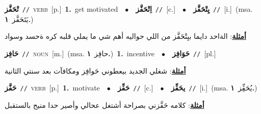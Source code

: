 \documentclass[10pt,a4paper,twoside]{article} %
\begin{document}
\begin{multicols}{2}
{\setlength\topsep{0pt}\textbf{\foreignlanguage{arabic}{تْحَفَّز}}\ {\color{gray}\texttt{//}\color{black}}\ \textsc{verb}\ [p.]\ \textbf{1.}~get motivated\ \ $\bullet$\ \ \setlength\topsep{0pt}\textbf{\foreignlanguage{arabic}{اِتْحَفَّز}}\ {\color{gray}\texttt{//}\color{black}}\ [c.]\ \ $\bullet$\ \ \setlength\topsep{0pt}\textbf{\foreignlanguage{arabic}{يِتْحَفَّز}}\ {\color{gray}\texttt{//}\color{black}}\ [i.]\ \color{gray}(msa. \foreignlanguage{arabic}{يَتَحَفَّز}~\foreignlanguage{arabic}{\textbf{١.}})\color{black}\  \begin{flushright}\color{gray}\foreignlanguage{arabic}{\textbf{\underline{\foreignlanguage{arabic}{أمثلة}}}: الةاحد دايما بيِتْحَفَّز من اللي حواليه أهم شي ما يملي قلبه كره ةحسد وسواد}\end{flushright}\color{black}} \vspace{2mm}

{\setlength\topsep{0pt}\textbf{\foreignlanguage{arabic}{حَافِز}}\ {\color{gray}\texttt{//}\color{black}}\ \textsc{noun}\ [m.]\ \color{gray}(msa. \foreignlanguage{arabic}{حافِز}~\foreignlanguage{arabic}{\textbf{١.}})\color{black}\ \textbf{1.}~incentive\ \ $\bullet$\ \ \setlength\topsep{0pt}\textbf{\foreignlanguage{arabic}{حَوَافِز}}\ {\color{gray}\texttt{//}\color{black}}\ [pl.]\  \begin{flushright}\color{gray}\foreignlanguage{arabic}{\textbf{\underline{\foreignlanguage{arabic}{أمثلة}}}: شغلي الجديد بيعطوني حَوافِز ومكافآت بعد سنتي الثانية}\end{flushright}\color{black}} \vspace{2mm}

{\setlength\topsep{0pt}\textbf{\foreignlanguage{arabic}{حَفَّز}}\ {\color{gray}\texttt{//}\color{black}}\ \textsc{verb}\ [p.]\ \textbf{1.}~motivate\ \ $\bullet$\ \ \setlength\topsep{0pt}\textbf{\foreignlanguage{arabic}{حَفِّز}}\ {\color{gray}\texttt{//}\color{black}}\ [c.]\ \ $\bullet$\ \ \setlength\topsep{0pt}\textbf{\foreignlanguage{arabic}{يحَفِّز}}\ {\color{gray}\texttt{//}\color{black}}\ [i.]\ \color{gray}(msa. \foreignlanguage{arabic}{يُحَفِِّز}~\foreignlanguage{arabic}{\textbf{١.}})\color{black}\  \begin{flushright}\color{gray}\foreignlanguage{arabic}{\textbf{\underline{\foreignlanguage{arabic}{أمثلة}}}: كلامه حَفَّزني بصراحة أشتغل عحالي وأصير حدا منيح بالستقبل}\end{flushright}\color{black}} \vspace{2mm}


\end{multicols}
\end{document}
